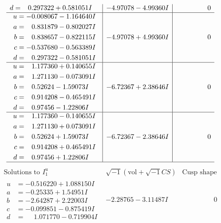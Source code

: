 \documentclass[1p]{elsarticle_modified}
\theoremstyle{definition}
\newcommand{\I}{\sqrt{-1}}
\begin{document}
$$\begin{array}{c|c|c}
\begin{aligned}
d &= \phantom{-}0.297322 + 0.581051 I\end{aligned}
 & -4.97078 - 4.99360 I & \phantom{-0.000000 } 0 \\ \hline\begin{aligned}
u &= -0.008067 - 1.164640 I \\
a &= \phantom{-}0.831879 - 0.802027 I \\
b &= \phantom{-}0.838657 - 0.822115 I \\
c &= -0.537680 - 0.563389 I \\
d &= \phantom{-}0.297322 - 0.581051 I\end{aligned}
 & -4.97078 + 4.99360 I & \phantom{-0.000000 } 0 \\ \hline\begin{aligned}
u &= \phantom{-}1.177360 + 0.140655 I \\
a &= \phantom{-}1.271130 - 0.073091 I \\
b &= \phantom{-}0.52624 - 1.59073 I \\
c &= \phantom{-}0.914208 - 0.465491 I \\
d &= \phantom{-}0.97456 - 1.22806 I\end{aligned}
 & -6.72367 + 2.38646 I & \phantom{-0.000000 } 0 \\ \hline\begin{aligned}
u &= \phantom{-}1.177360 - 0.140655 I \\
a &= \phantom{-}1.271130 + 0.073091 I \\
b &= \phantom{-}0.52624 + 1.59073 I \\
c &= \phantom{-}0.914208 + 0.465491 I \\
d &= \phantom{-}0.97456 + 1.22806 I\end{aligned}
 & -6.72367 - 2.38646 I & \phantom{-0.000000 } 0\\
 \hline 
 \end{array}$$\newpage$$\begin{array}{c|c|c}  
\text{Solutions to }I^u_{1}& \I (\text{vol} + \sqrt{-1}CS) & \text{Cusp shape}\\
 \hline 
\begin{aligned}
u &= -0.516220 + 1.088150 I \\
a &= -0.25335 + 1.54951 I \\
b &= -2.64287 + 2.22003 I \\
c &= -0.099851 - 0.875419 I \\
d &= \phantom{-}1.071770 - 0.719904 I\end{aligned}
 & -2.28765 - 3.11487 I & \phantom{-0.000000 } 0 \\ \hline\begin{aligned}

\end{aligned}
\end{array}$$
\end{document}

